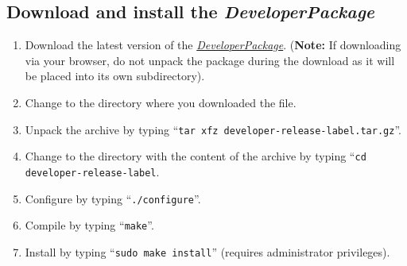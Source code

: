 \documentclass[12pt]{article}
\begin{document}
\subsection*{Download and install the {\it DeveloperPackage}}

\begin{enumerate}
   \item Download the latest version of the \href{https://github.com/HugoCornelis/developer/blob/master/developer-0.0.0-alpha.tar.gz?raw=true}{{\it DeveloperPackage}}.  ({\bf Note:} If downloading via your browser, do not unpack the package during the download as it will be placed into its own subdirectory).
   \item Change to the directory where you downloaded the file.
   \item Unpack the archive by typing ``{\tt tar xfz developer-release-label.tar.gz}''.
   \item Change to the directory with the content of the archive by typing ``{\tt cd developer-release-label}.
   \item Configure by typing ``{\tt ./configure}''.
   \item Compile by typing ``{\tt make}''.
   \item Install by typing ``{\tt sudo make install}''  (requires administrator privileges). 
\end{enumerate}



\end{document}
